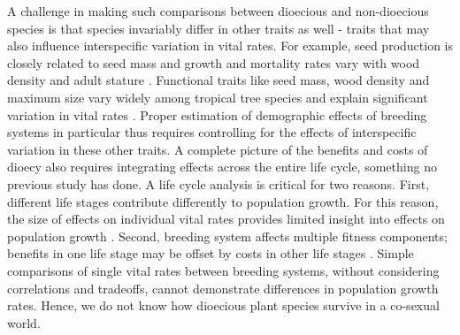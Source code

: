 \documentclass[b5paper,justified]{tufte-book} %
\begin{document}
\begin{fullwidth}
A challenge in making such comparisons between dioecious and non-dioecious species is that species invariably differ in other traits as well - traits that may also influence interspecific variation in vital rates. For example, seed production is closely related to seed mass \citep{Moles2004, Muller-Landau2008} and growth and mortality rates vary with wood density and adult stature \citep{Muller-Landau2004, Kraft2010}. Functional traits like seed mass, wood density and maximum size vary widely among tropical tree species and explain significant variation in vital rates \citep{Poorter2008, Wright2010, Visser2016}. Proper estimation of demographic effects of breeding systems in particular thus requires controlling for the effects of interspecific variation in these other traits. 
A complete picture of the benefits and costs of dioecy also requires integrating effects across the entire life cycle, something no previous study has done. A life cycle analysis is critical for two reasons. First, different life stages contribute differently to population growth. For this reason, the size of effects on individual vital rates provides limited insight into effects on population growth \citep{DeKroon1986, Ehrlen2003}. Second, breeding system affects multiple fitness components; benefits in one life stage may be offset by costs in other life stages \citep{Visser2016}. Simple comparisons of single vital rates between breeding systems, without considering correlations and tradeoffs, cannot demonstrate differences in population growth rates. Hence, we do not know how dioecious plant species survive in a co-sexual world.


\end{fullwidth}
\end{document}
